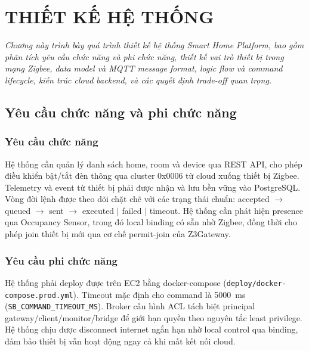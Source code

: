 \chapter{THIẾT KẾ HỆ THỐNG}
\label{ch:thietke}

\vspace{0.5cm}
\noindent\textit{Chương này trình bày quá trình thiết kế hệ thống
Smart Home Platform, bao gồm phân tích yêu cầu chức năng và phi
chức năng, thiết kế vai trò thiết bị trong mạng Zigbee, data model
và MQTT message format, logic flow và command lifecycle, kiến trúc
cloud backend, và các quyết định trade-off quan trọng.}
\vspace{0.5cm}

\section{Yêu cầu chức năng và phi chức năng}
\label{sec:ch2-requirements}

\subsection{Yêu cầu chức năng}
\label{sec:ch2-func-req}

Hệ thống cần quản lý danh sách home, room và device qua REST API,
cho phép điều khiển bật/tắt đèn thông qua cluster 0x0006 từ cloud
xuống thiết bị Zigbee. Telemetry và event từ thiết bị phải được nhận
và lưu bền vững vào PostgreSQL. Vòng đời lệnh được theo dõi chặt
chẽ với các trạng thái chuẩn: accepted $\rightarrow$ queued
$\rightarrow$ sent $\rightarrow$ executed $|$ failed $|$ timeout.
Hệ thống cần phát hiện presence qua Occupancy Sensor, trong đó local
binding có sẵn nhờ Zigbee, đồng thời cho phép join thiết bị mới qua
cơ chế permit-join của Z3Gateway.

\subsection{Yêu cầu phi chức năng}
\label{sec:ch2-nonfunc-req}

Hệ thống phải deploy được trên EC2 bằng docker-compose
(\texttt{deploy/docker-compose.prod.yml}). Timeout mặc định cho
command là 5000~ms (\texttt{SB\_COMMAND\_TIMEOUT\_MS}). Broker cấu
hình ACL tách biệt principal gateway/client/monitor/bridge để giới
hạn quyền theo nguyên tắc least privilege. Hệ thống chịu được
disconnect internet ngắn hạn nhờ local control qua binding, đảm bảo
thiết bị vẫn hoạt động ngay cả khi mất kết nối cloud.

